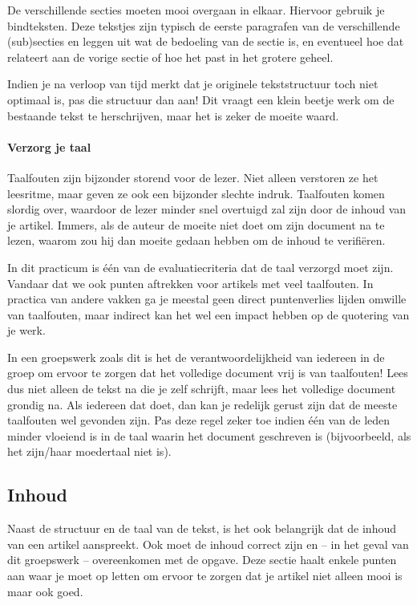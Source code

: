 \documentclass[a4paper]{article}
\begin{document}
De verschillende secties moeten mooi overgaan in elkaar.
Hiervoor gebruik je bindteksten.
Deze tekstjes zijn typisch de eerste paragrafen van de verschillende (sub)secties en leggen uit wat de bedoeling van de sectie is, en eventueel hoe dat relateert aan de vorige sectie of hoe het past in het grotere geheel.

Indien je na verloop van tijd merkt dat je originele tekststructuur toch niet optimaal is, pas die structuur dan aan!
Dit vraagt een klein beetje werk om de bestaande tekst te herschrijven, maar het is zeker de moeite waard.


\paragraph{Verzorg je taal}

Taalfouten zijn bijzonder storend voor de lezer.
Niet alleen verstoren ze het leesritme, maar geven ze ook een bijzonder slechte indruk.
Taalfouten komen slordig over, waardoor de lezer minder snel overtuigd zal zijn door de inhoud van je artikel.
Immers, als de auteur de moeite niet doet om zijn document na te lezen, waarom zou hij dan moeite gedaan hebben om de inhoud te verifi\"eren.

In dit practicum is \'e\'en van de evaluatiecriteria dat de taal verzorgd moet zijn.
Vandaar dat we ook punten aftrekken voor artikels met veel taalfouten.
In practica van andere vakken ga je meestal geen direct puntenverlies lijden omwille van taalfouten, maar indirect kan het wel een impact hebben op de quotering van je werk.

In een groepswerk zoals dit is het de verantwoordelijkheid van iedereen in de groep om ervoor te zorgen dat het volledige document vrij is van taalfouten!
Lees dus niet alleen de tekst na die je zelf schrijft, maar lees het volledige document grondig na.
Als iedereen dat doet, dan kan je redelijk gerust zijn dat de meeste taalfouten wel gevonden zijn.
Pas deze regel zeker toe indien \'e\'en van de leden minder vloeiend is in de taal waarin het document geschreven is (bijvoorbeeld, als het zijn/haar moedertaal niet is).


\subsection{Inhoud}

Naast de structuur en de taal van de tekst, is het ook belangrijk dat de inhoud van een artikel aanspreekt.
Ook moet de inhoud correct zijn en – in het geval van dit groepswerk – overeenkomen met de opgave.
Deze sectie haalt enkele punten aan waar je moet op letten om ervoor te zorgen dat je artikel niet alleen mooi is maar ook goed.
\end{document}
